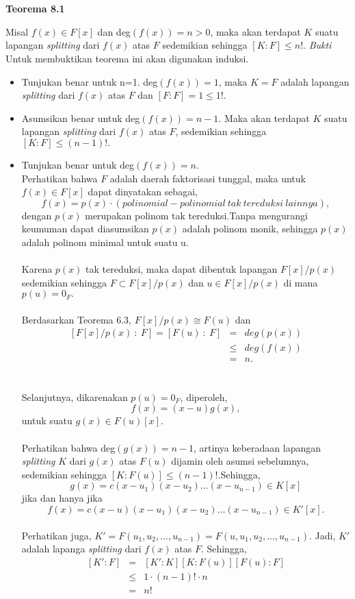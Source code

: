 \\
\\
	\textbf{Teorema 8.1}
\par	Misal $f(x) \in F[x]$ dan deg$(f(x))=n>0$, maka akan terdapat $K$ suatu lapangan \textit{splitting} dari $f(x)$ atas $F$ sedemikian sehingga $[K:F] \le n!.$
	\textit{Bukti}
\\ 	Untuk membuktikan teorema ini akan digunakan induksi.
	\begin{itemize}
	\item Tunjukan benar untuk n=1. deg$(f(x))=1$, maka $K=F$ adalah lapangan \textit{splitting} dari $f(x)$ atas $F$ dan $[F:F]=1\le 1!.$
	\item Asumsikan benar untuk deg$(f(x)) =n-1.$  Maka akan terdapat $K$ suatu lapangan \textit{splitting} dari $f(x)$ atas $F$,  sedemikian sehingga $[K:F]\le (n-1)!.$
	\item Tunjukan benar untuk deg$(f(x))=n$.\\
	Perhatikan bahwa $F$ adalah daerah faktorisasi tunggal, maka untuk $f(x)\in F[x]$ dapat dinyatakan sebagai, $$f(x)=p(x)\cdot (polinomial-polinomial~tak~tereduksi~lainnya),$$ dengan $p(x)$ merupakan polinom tak tereduksi.Tanpa mengurangi keumuman dapat 			diasumsikan $p(x)$ adalah polinom monik, sehingga $p(x)$ adalah polinom minimal untuk suatu u.\\ \\
	Karena $p(x)$ tak tereduksi, maka dapat dibentuk lapangan $F[x]/p(x)$ sedemikian sehingga $F\subset F[x]/p(x)$ dan $u\in F[x]/p(x)$ di mana $p(u)=0_F.$ \\ \\
	Berdasarkan Teorema 6.3, $F[x]/p(x)\cong F(u)$ dan 
	$$\begin{array}{rcl}
	[F[x]/p(x)~:~F] = [F(u)~:~F]&=&deg(p(x))\\ 
	&\le& deg(f(x))\\ 
	&=& n.
	\end{array}$$
	\\ \\
	Selanjutnya, dikarenakan $p(u)=0_F$, diperoleh, $$f(x)=(x-u)g(x),$$ untuk suatu $g(x)\in F(u)[x].$\\ \\
	Perhatikan bahwa deg$(g(x))=n-1$, artinya keberadaan lapangan \textit{splitting} $K$ dari $g(x)$ atas $F(u)$ dijamin oleh asumsi sebelumnya, sedemikian sehingga $[K:F(u)]\le (n-1)!$.Sehingga,$$ g(x)=c(x-u_1)(x-u_2)...(x-u_{n-1})\in K[x]$$ jika dan hanya jika 
	$$f(x)=c(x-u)(x-u_1)(x-u_2)...(x-u_{n-1})\in K'[x].$$\\
	Perhatikan juga, $K'=F(u_1,u_2,...,u_{n-1})=F(u,u_1,u_2,...,u_{n-1})$. Jadi, $K'$ adalah lapanga \textit{splitting} dari $f(x)$ atas $F$. Sehingga,
	$$\begin{array}{rcl}
	[K':F]&=&[K':K][K:F(u)][F(u):F]\\
	&\le& 1\cdot (n-1)!\cdot n\\
	&=& n!
	\end{array}$$
	\end{itemize}
